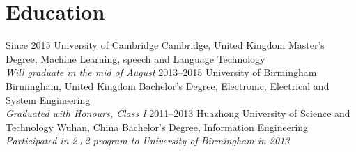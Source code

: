 \documentclass[]{friggeri-cv}
\begin{document}
\section{Education}

\begin{entrylist}
  \entry
    {Since 2015}
    {University of Cambridge}
    {Cambridge, United Kingdom}
    {Master's Degree, Machine Learning, speech and Language Technology\\
    \emph{Will graduate in the mid of August}}
  \entry
    {2013–2015}
    {University of Birmingham}
    {Birmingham, United Kingdom}
    {Bachelor's Degree, Electronic, Electrical and System Engineering\\\emph{Graduated with Honours, Class I}}
  \entry
    {2011–2013}
    {Huazhong University of Science and Technology}
    {Wuhan, China}
    {Bachelor's Degree, Information Engineering\\\emph{Participated in 2+2 program to University of Birmingham in 2013}}
\end{entrylist}    
\end{document}

